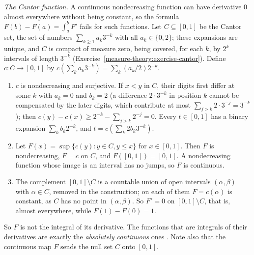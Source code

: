 \begin{counterexample}\label{measure-theory:counterexample-cantor-function}
\emph{The Cantor function.} A continuous nondecreasing function can have derivative $0$ almost everywhere without being constant, so the formula
$F(b) - F(a) = \int_a^bF'$ fails for such functions. Let $C \subseteq [0, 1]$ be the Cantor set, the set of numbers $\sum_{k \geq 1}a_k3^{-k}$ with all
$a_k \in \{0, 2\}$; these expansions are unique, and $C$ is compact of measure zero, being covered, for each $k$, by $2^k$ intervals of length $3^{-k}$
(Exercise~\ref{measure-theory:exercise-cantor}). Define $c \colon C \to [0, 1]$ by $c(\sum_ka_k3^{-k}) = \sum_k(a_k/2)2^{-k}$.
\begin{enumerate}
\item $c$ is nondecreasing and surjective. If $x < y$ in $C$, their digits first differ at some $k$ with $a_k = 0$ and $b_k = 2$ (a difference $2 \cdot 3^{-k}$ in
position $k$ cannot be compensated by the later digits, which contribute at most $\sum_{j > k}2 \cdot 3^{-j} = 3^{-k}$); then $c(y) - c(x) \geq 2^{-k} - \sum_{j > k}2^{-j} = 0$.
Every $t \in [0, 1]$ has a binary expansion $\sum_kb_k2^{-k}$, and $t = c(\sum_k2b_k3^{-k})$.
\item Let $F(x) = \sup\{c(y) : y \in C, y \leq x\}$ for $x \in [0, 1]$. Then $F$ is nondecreasing, $F = c$ on $C$, and $F([0, 1]) = [0, 1]$. A nondecreasing function
whose image is an interval has no jumps, so $F$ is continuous.
\item The complement $[0, 1] \setminus C$ is a countable union of open intervals $(\alpha, \beta)$ with $\alpha \in C$, removed in the construction; on each of them
$F = c(\alpha)$ is constant, as $C$ has no point in $(\alpha, \beta)$. So $F' = 0$ on $[0, 1] \setminus C$, that is, almost everywhere, while $F(1) - F(0) = 1$.
\end{enumerate}
So $F$ is not the integral of its derivative. The functions that are integrals of their derivatives are exactly the \emph{absolutely continuous} ones
\cite[Chapter 7]{rudin-rca}. Note also that the continuous map $F$ sends the null set $C$ onto $[0, 1]$.
\end{counterexample}

